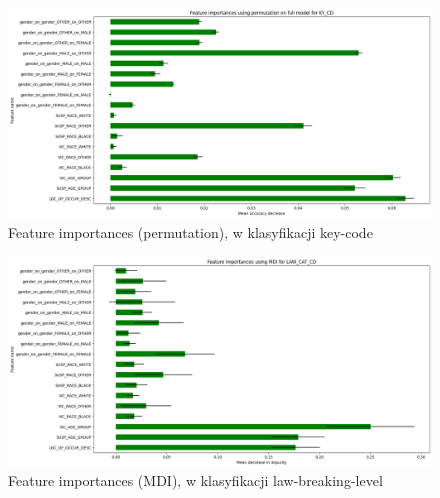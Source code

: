\documentclass{classrep}
\begin{document}
{{{{                    \begin{figure}[!htbp]
                        \centering
                        \includegraphics[width=\textwidth]{img/5.1.3/5/Feature importances using permutation on full model for KY_CD.png}
                        \caption{Feature importances (permutation), w klasyfikacji key-code}
                        \label{goal_1_exp_5_imp_perm_key}
                    \end{figure}
                    
                    \begin{figure}[!htbp]
                        \centering
                        \includegraphics[width=\textwidth]{img/5.1.3/5/Feature importances using MDI for LAW_CAT_CD.png}
                        \caption{Feature importances (MDI), w klasyfikacji law-breaking-level}
                        \label{goal_1_exp_5_imp_mdi_law}
                    \end{figure}
                    
}}}}
\end{document}
